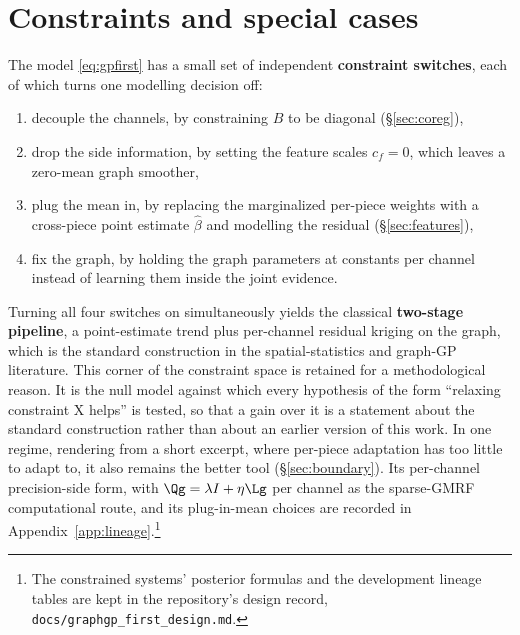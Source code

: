 \section{Constraints and special cases}\label{sec:special-cases}
The model \eqref{eq:gpfirst} has a small set of independent
\textbf{constraint switches}, each of which turns one modelling decision
off:
\begin{enumerate}[leftmargin=2em,noitemsep]
  \item decouple the channels, by constraining $B$ to be diagonal
        (\S\ref{sec:coreg}),
  \item drop the side information, by setting the feature scales $c_f = 0$,
        which leaves a zero-mean graph smoother,
  \item plug the mean in, by replacing the marginalized per-piece weights
        with a cross-piece point estimate $\hat\beta$ and modelling the
        residual (\S\ref{sec:features}),
  \item fix the graph, by holding the graph parameters at constants per
        channel instead of learning them inside the joint evidence.
\end{enumerate}
Turning all four switches on simultaneously yields the classical
\textbf{two-stage pipeline}, a point-estimate trend plus per-channel
residual kriging on the graph, which is the standard construction in the
spatial-statistics and graph-GP literature. This corner of the constraint
space is retained for a methodological reason. It is the null model against
which every hypothesis of the form ``relaxing constraint X helps'' is
tested, so that a gain over it is a statement about the standard
construction rather than about an earlier version of this work. In one
regime, rendering from a short excerpt, where per-piece adaptation has too
little to adapt to, it also remains the better tool (\S\ref{sec:boundary}).
Its per-channel precision-side form, with $\Qg = \lambda I + \eta \Lg$ per
channel as the sparse-GMRF computational route, and its plug-in-mean choices
are recorded in Appendix~\ref{app:lineage}.\footnote{The constrained
systems' posterior formulas and the development lineage tables are kept in
the repository's design record, \texttt{docs/graphgp\_first\_design.md}.}


